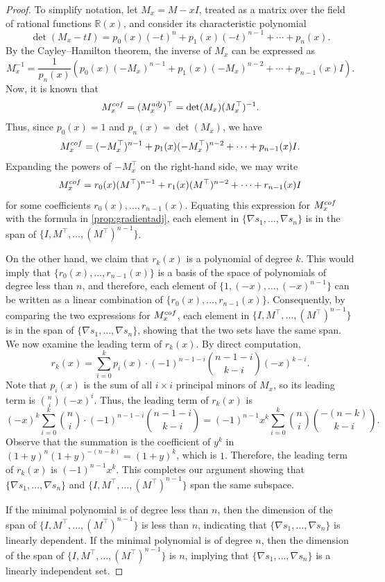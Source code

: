 \documentclass[10pt,a4paper]{amsart}
\newcommand{\adj}{^{\rm adj}}
\newcommand{\cof}{^{\rm cof}}
\newcommand{\trans}{^\top}
\begin{document}
\begin{proof}
To simplify notation, let $M_x = M - xI$, treated as a matrix over the field of rational functions $\mathbb{R}(x)$, and consider its characteristic polynomial 
\[
    \det(M_x - tI) = p_0(x)(-t)^n + p_1(x)(-t)^{n-1} + \cdots + p_n(x).
\]
By the Cayley--Hamilton theorem, the inverse of $M_x$ can be expressed as 
\[
    M_x^{-1} = \frac{1}{p_n(x)}(p_0(x)(-M_x)^{n-1} + p_1(x)(-M_x)^{n-2} + \cdots + p_{n-1}(x)I).
\]
Now, it is known that 
\[
    M_x\cof = (M_x\adj)\trans = \det(M_x)(M_x\trans)^{-1}.
\]
Thus, since $p_0(x) = 1$ and $p_n(x) = \det(M_x)$, we have 
\[
    M_x\cof = (-M_x\trans)^{n-1} + p_1(x)(-M_x\trans)^{n-2} + \cdots + p_{n-1}(x)I.
\]
Expanding the powers of $-M_x\trans$ on the right-hand side, we may write 
\[
    M_x\cof = r_0(x)(M\trans)^{n-1} + r_1(x)(M\trans)^{n-2} + \cdots + r_{n-1}(x)I
\]
for some coefficients $r_0(x), \dots, r_{n-1}(x)$.
Equating this expression  for $M_x\cof$ with the formula in \cref{prop:gradientadj}, each element in $\{\nabla s_1, \ldots, \nabla s_n\}$ is in the span of $\{I, M\trans, \ldots, (M\trans)^{n-1}\}$.  

On the other hand, we claim that $r_k(x)$ is a polynomial of degree $k$.  This would imply that $\{r_0(x), \ldots, r_{n-1}(x)\}$ is a basis of the space of polynomials of degree less than $n$, and  therefore, each element of $\{1, (-x), \ldots, (-x)^{n-1}\}$ can be written as a linear combination of $\{r_0(x), \ldots, r_{n-1}(x)\}$.  Consequently, by comparing the two expressions for  $M_x\cof $, each element in $\{I, M\trans, \ldots, (M\trans)^{n-1}\}$ is  in the span of $\{\nabla s_1, \ldots, \nabla s_n\}$, showing that the  two sets  have the same span.   We now examine the leading term of $r_k(x)$.    By direct computation, 
\[
    r_k(x) = \sum_{i=0}^{k} p_i(x) \cdot (-1)^{n-1-i} \binom{n-1-i}{k-i}(-x)^{k-i}.
\]
Note that $p_i(x)$ is the sum of all $i\times i$ principal minors of $M_x$, so its leading term is $\binom{n}{i}(-x)^i$.  Thus, the leading term of $r_k(x)$ is 
\[
    (-x)^{k}\sum_{i=0}^{k} \binom{n}{i} \cdot (-1)^{n-1-i} \binom{n-1-i}{k-i} = (-1)^{n-1}x^{k}\sum_{i=0}^{k} \binom{n}{i}\binom{-(n-k)}{k-i}.
\]
Observe that the summation is the coefficient of $y^k$ in $(1+y)^n(1+y)^{-(n-k)} = (1+y)^k$, which is $1$.   Therefore, the leading term of $r_k(x)$ is $(-1)^{n-1}x^k$.  This completes our argument showing that $
\{\nabla s_1, \ldots, \nabla s_n\}$ and $\{I, M\trans, \ldots, (M\trans)^{n-1}\}$ span the same subspace.

If the minimal polynomial is of degree less than $n$, then the dimension of the span of $\{I, M\trans, \ldots, (M\trans)^{n-1}\}$ is less than $n$, indicating that $\{\nabla s_1, \ldots, \nabla s_n\}$ is linearly dependent.  If  the minimal polynomial is of degree $n$, then the dimension of the span of $\{I, M\trans, \ldots, (M\trans)^{n-1}\}$ is $n$, implying that $\{\nabla s_1, \ldots, \nabla s_n\}$ is a linearly independent set.
\end{proof}
\end{document}
